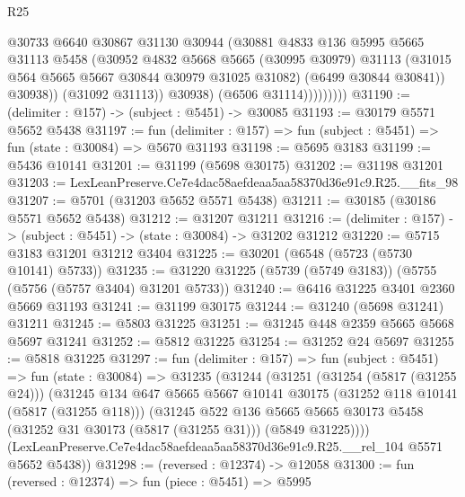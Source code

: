 \begin{lexlean}{R25}
\begin{coremodule}
                          @30733
                          @6640
                          @30867
                          @31130
                          @30944
                          (@30881
                            @4833
                            @136
                            @5995
                            @5665
                            @31113
                            @5458
                            (@30952
                              @4832
                              @5668
                              @5665
                              (@30995 @30979)
                              @31113
                              (@31015 @564 @5665 @5667 @30844 @30979 @31025 @31082)
                              (@6499 @30844 @30841))
                            @30938))
                        (@31092 @31113))
                      @30938)
                    (@6506 @31114)))))))))
@31190 := (delimiter : @157) -> (subject : @5451) -> @30085
@31193 := @30179 @5571 @5652 @5438
@31197 := fun (delimiter : @157) => fun (subject : @5451) => fun (state : @30084) => @5670 @31193
@31198 := @5695 @3183
@31199 := @5436 @10141
@31201 := @31199 (@5698 @30175)
@31202 := @31198 @31201
@31203 := LexLeanPreserve.Ce7e4dac58aefdeaa5aa58370d36e91c9.R25.__fits_98
@31207 := @5701 (@31203 @5652 @5571 @5438)
@31211 := @30185 (@30186 @5571 @5652 @5438)
@31212 := @31207 @31211
@31216 := (delimiter : @157) -> (subject : @5451) -> (state : @30084) -> @31202 @31212
@31220 := @5715 @3183 @31201 @31212 @3404
@31225 := @30201 (@6548 (@5723 (@5730 @10141) @5733))
@31235 := @31220 @31225 (@5739 (@5749 @3183)) (@5755 (@5756 (@5757 @3404) @31201 @5733))
@31240 := @6416 @31225 @3401 @2360 @5669 @31193
@31241 := @31199 @30175
@31244 := @31240 (@5698 @31241) @31211
@31245 := @5803 @31225
@31251 := @31245 @448 @2359 @5665 @5668 @5697 @31241
@31252 := @5812 @31225
@31254 := @31252 @24 @5697
@31255 := @5818 @31225
@31297 := fun (delimiter : @157) =>
  fun (subject : @5451) =>
  fun (state : @30084) =>
  @31235
    (@31244
      (@31251
        (@31254 (@5817 (@31255 @24)))
        (@31245
          @134
          @647
          @5665
          @5667
          @10141
          @30175
          (@31252 @118 @10141 (@5817 (@31255 @118)))
          (@31245
            @522
            @136
            @5665
            @5665
            @30173
            @5458
            (@31252 @31 @30173 (@5817 (@31255 @31)))
            (@5849 @31225))))
      (LexLeanPreserve.Ce7e4dac58aefdeaa5aa58370d36e91c9.R25.__rel_104 @5571 @5652 @5438))
@31298 := (reversed : @12374) -> @12058
@31300 := fun (reversed : @12374) => fun (piece : @5451) => @5995

\end{coremodule}
\end{lexlean}
